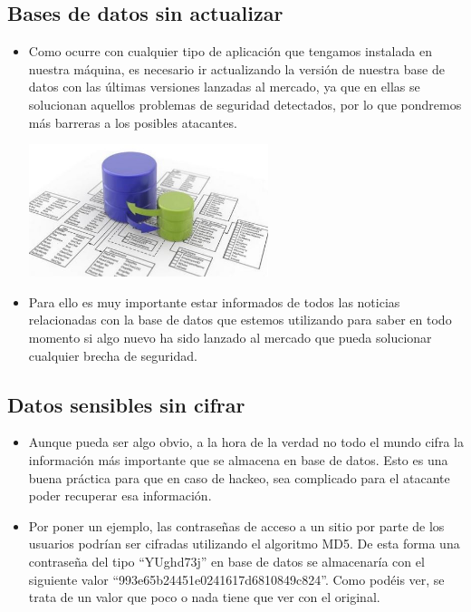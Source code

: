 \documentclass[%
 reprint,
 amsmath,amssymb,
 aps,
]{revtex4-1}
\begin{document}
\subsection{Bases de datos sin actualizar}
\begin{itemize}
\item Como ocurre con cualquier tipo de aplicación que tengamos instalada en nuestra máquina, es necesario ir
actualizando la versión de nuestra base de datos con las últimas versiones lanzadas al mercado, ya que en
ellas se solucionan aquellos problemas de seguridad detectados, por lo que pondremos más barreras a los
posibles atacantes.
\begin{center}
	\includegraphics[width=7cm]{./Imagenes/bd}
\end{center}	
\item Para ello es muy importante estar informados de todos las noticias relacionadas con la base de datos que
estemos utilizando para saber en todo momento si algo nuevo ha sido lanzado al mercado que pueda
solucionar cualquier brecha de seguridad.
\end{itemize}
\subsection{ Datos sensibles sin cifrar}
\begin{itemize}
\item Aunque pueda ser algo obvio, a la hora de la verdad no todo el mundo cifra la información más importante
que se almacena en base de datos. Esto es una buena práctica para que en caso de hackeo, sea complicado
para el atacante poder recuperar esa información.
\item Por poner un ejemplo, las contraseñas de acceso a un sitio por parte de los usuarios podrían ser cifradas
utilizando el algoritmo MD5. De esta forma una contraseña del tipo “YUghd73j” en base de datos se
almacenaría con el siguiente valor “993e65b24451e0241617d6810849c824”. Como podéis ver, se trata de
un valor que poco o nada tiene que ver con el original.
\end{itemize}
\end{document}
